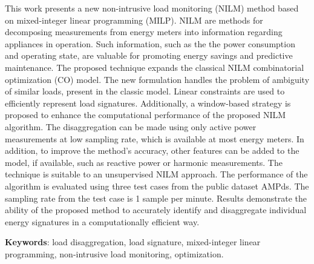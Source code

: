 This work presents a new non-intrusive load monitoring (NILM) method based on mixed-integer linear programming (MILP). NILM are methods for decomposing measurements from energy meters into information regarding appliances in operation. Such information, such as the the power consumption and operating state, are valuable for promoting energy savings and predictive maintenance. The proposed technique expands the classical NILM combinatorial optimization (CO) model. The new formulation handles the problem of ambiguity of similar loads, present in the classic model. Linear constraints are used to efficiently represent load signatures. Additionally, a window-based strategy is proposed to enhance the computational performance of the proposed NILM algorithm. The disaggregation can be made using only active power measurements at low sampling rate, which is available at most energy meters. In addition, to improve the method's accuracy, other features can be added to the model, if available, such as reactive power or harmonic measurements. The technique is suitable to an unsupervised NILM approach. The performance of the algorithm is evaluated using three test cases from the public dataset AMPds. The sampling rate from the test case is 1 sample per minute. Results demonstrate the ability of the proposed method to accurately identify and disaggregate individual energy signatures in a computationally efficient way.


\vspace{.2cm}
\textbf{Keywords}:
load disaggregation, load signature, mixed-integer linear programming, non-intrusive load monitoring, optimization.